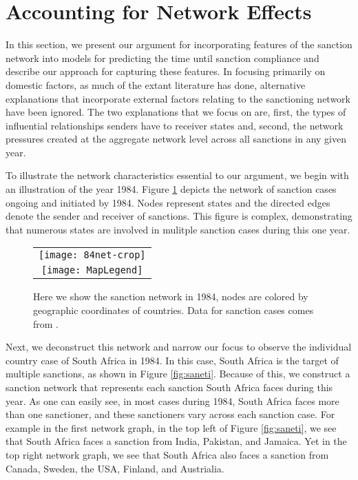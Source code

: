 \section*{Accounting for Network Effects}
\label{neteffects}

In this section, we present our argument for incorporating features of the sanction network into models for predicting the time until sanction compliance and describe our approach for capturing these features. In focusing primarily on domestic factors, as much of the extant literature has done, alternative explanations that incorporate external factors relating to the sanctioning network have been ignored. The two explanations that we focus on are, first, the types of influential relationships senders have to receiver states and, second, the network pressures created at the aggregate network level across all sanctions in any given year. %

To illustrate the network characteristics essential to our argument, we begin with an illustration of the year 1984. Figure \ref{fig:spaghetti} depicts the network of sanction cases ongoing and initiated by 1984. Nodes represent states and the directed edges denote the sender and receiver of sanctions. This figure is complex, demonstrating that numerous states are involved in mulitple sanction cases during this one year.

\begin{figure}[ht]
  \centering
  \begin{tabular}{c}
	  \texttt{[image: 84net-crop]} \\
	  \texttt{[image: MapLegend]}
  \end{tabular}
  \caption{Here we show the sanction network in 1984, nodes are colored by geographic coordinates of countries. Data for sanction cases comes from \citet{morgan2009threat}.}
  \label{fig:spaghetti}
\end{figure}
\FloatBarrier

Next, we deconstruct this network and narrow our focus to observe the individual country case of South Africa in 1984. In this case, South Africa is the target of multiple sanctions, as shown in Figure \ref{fig:saneti}. Because of this, we construct a sanction network that represents each sanction South Africa faces during this year. As one can easily see, in most cases during 1984, South Africa faces more than one sanctioner, and these sanctioners vary across each sanction case. For example in the first network graph, in the top left of Figure \ref{fig:saneti}, we see that South Africa faces a sanction from India, Pakistan, and Jamaica. Yet in the top right network graph, we see that South Africa also faces a sanction from Canada, Sweden, the USA, Finland, and Austrialia. 

